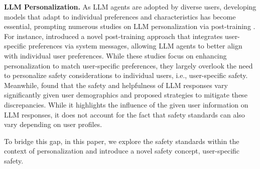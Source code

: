 

\noindent \textbf{LLM Personalization.} \@  As LLM agents are adopted by diverse users, developing models that adapt to individual preferences and characteristics has become essential, prompting numerous studies on LLM personalization via post-training \cite{jang2023personalized, cheng2023everyone, wu2023fine,li2024personalized, chakraborty2024maxmin, lee2024aligning, zhang2024personalization}. For instance, \citet{lee2024aligning} introduced a novel post-training approach that integrates user-specific preferences via system messages, allowing LLM agents to better align with individual user preferences. While these studies focus on enhancing personalization to match user-specific preferences, they largely overlook the need to personalize safety considerations to individual users, i.e., user-specific safety. Meanwhile, \citet{vijjini2024exploring} found that the safety and helpfulness of LLM responses vary significantly given user demographics and proposed strategies to mitigate these discrepancies. While it highlights the influence of the given user information on LLM responses, it does not account for the fact that safety standards can also vary depending on user profiles.

To bridge this gap, in this paper, we explore the safety standards within the context of personalization and introduce a novel safety concept, user-specific safety.

